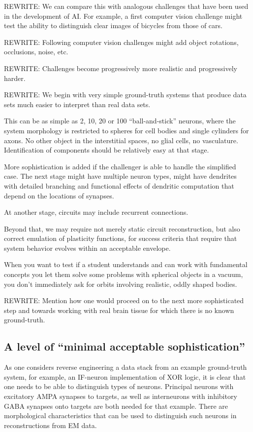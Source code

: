 \documentclass{ldr-article}
\begin{document}
\alert{REWRITE:} We can compare this with analogous challenges that have been used in the development of AI. For example, a first computer vision challenge might test the ability to distinguish clear images of bicycles from those of cars.

\alert{REWRITE:} Following computer vision challenges might add object rotations, occlusions, noise, etc.

\alert{REWRITE:} Challenges become progressively more realistic and progressively harder.

\alert{REWRITE:} We begin with very simple ground-truth systems that produce data sets much easier to interpret than real data sets.

This can be as simple as 2, 10, 20 or 100 “ball-and-stick” neurons, where the system morphology is restricted to spheres for cell bodies and single cylinders for axons. No other object in the interstitial spaces, no glial cells, no vasculature. Identification of components should be relatively easy at that stage.

More sophistication is added if the challenger is able to handle the simplified case. The next stage might have multiple neuron types, might have dendrites with detailed branching and functional effects of dendritic computation that depend on the locations of synapses.

At another stage, circuits may include recurrent connections.

Beyond that, we may require not merely static circuit reconstruction, but also correct emulation of plasticity functions, for success criteria that require that system behavior evolves within an acceptable envelope.

When you want to test if a student understands and can work with fundamental concepts you let them solve some problems with spherical objects in a vacuum, you don’t immediately ask for orbits involving realistic, oddly shaped bodies.

\alert{REWRITE:} Mention how one would proceed on to the next more sophisticated step and towards working with real brain tissue for which there is no known ground-truth.

\subsection{A level of ``minimal acceptable sophistication''}

As one considers reverse engineering a data stack from an example ground-truth system, for example, an IF-neuron implementation of XOR logic, it is clear that one needs to be able to distinguish types of neurons. Principal neurons with excitatory AMPA synapses to targets, as well as interneurons with inhibitory GABA synapses onto targets are both needed for that example. There are morphological characteristics that can be used to distinguish such neurons in reconstructions from EM data.
\end{document}
